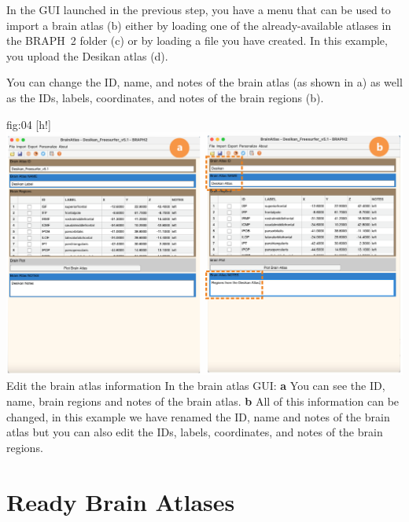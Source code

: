 \documentclass[justified]{tufte-handout}
\begin{document}
In the GUI launched in the previous step, you have a menu that can be used to import a brain atlas (b) either by loading one of the already-available atlases in the BRAPH~2 folder  (c) or by loading a file you have created. In this example, you upload the Desikan atlas (d).

You can change the ID, name, and notes of the brain atlas (as shown in a) as well as the IDs, labels, coordinates, and notes of the brain regions (b).


	{fig:04}
	{
	[h!]
	\includegraphics{fig04.png}
	}
	{Edit the brain atlas information}
	{
	In the brain atlas GUI: 
	{\bf a} You can see the ID, name, brain regions and notes of the brain atlas.
	{\bf b} All of this information can be changed, in this example we have renamed the ID, name and notes of the brain atlas but you can also edit the IDs, labels, coordinates, and notes of the brain regions.
	}

\section{Ready Brain Atlases}
\end{document}
